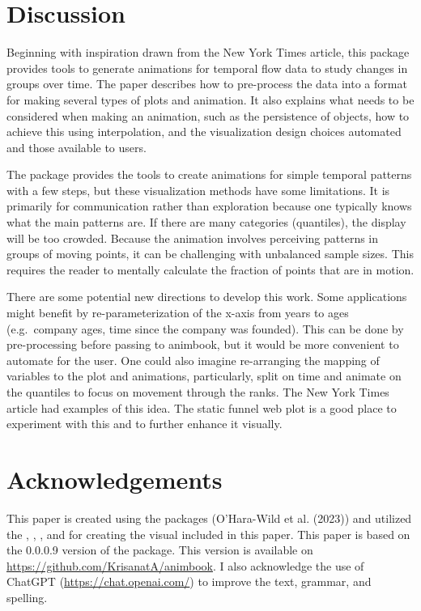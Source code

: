 \hypertarget{discussion}{%
\section{Discussion}\label{discussion}}

Beginning with inspiration drawn from the New York Times article, this package provides tools to generate animations for temporal flow data to study changes in groups over time. The paper describes how to pre-process the data into a format for making several types of plots and animation. It also explains what needs to be considered when making an animation, such as the persistence of objects, how to achieve this using interpolation, and the visualization design choices automated and those available to users.

The package provides the tools to create animations for simple temporal patterns with a few steps, but these visualization methods have some limitations. It is primarily for communication rather than exploration because one typically knows what the main patterns are. If there are many categories (quantiles), the display will be too crowded. Because the animation involves perceiving patterns in groups of moving points, it can be challenging with unbalanced sample sizes. This requires the reader to mentally calculate the fraction of points that are in motion.

There are some potential new directions to develop this work. Some applications might benefit by re-parameterization of the x-axis from years to ages (e.g.~company ages, time since the company was founded). This can be done by pre-processing before passing to animbook, but it would be more convenient to automate for the user. One could also imagine re-arranging the mapping of variables to the plot and animations, particularly, split on time and animate on the quantiles to focus on movement through the ranks. The New York Times article had examples of this idea. The static funnel web plot is a good place to experiment with this and to further enhance it visually.

\hypertarget{acknowledgements}{%
\section*{Acknowledgements}\label{acknowledgements}}

This paper is created using the  packages (O'Hara-Wild et al. (2023)) and utilized the , , , and  for creating the visual included in this paper. This paper is based on the 0.0.0.9 version of the  package. This version is available on \url{https://github.com/KrisanatA/animbook}.
I also acknowledge the use of ChatGPT (\url{https://chat.openai.com/}) to improve the text, grammar, and spelling.

